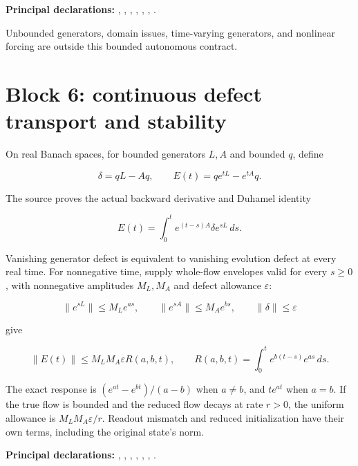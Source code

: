\documentclass[11pt]{article}
\begin{document}
\textbf{Principal declarations:}
\texttt{},
\texttt{},
\texttt{},
\texttt{},
\texttt{},
\texttt{},
\texttt{}.

Unbounded generators, domain issues, time-varying generators, and
nonlinear forcing are outside this bounded autonomous contract.

\hypertarget{block-6-continuous-defect-transport-and-stability}{%
\section{Block 6: continuous defect transport and
stability}\label{block-6-continuous-defect-transport-and-stability}}

On real Banach spaces, for bounded generators \(L,A\) and bounded \(q\),
define

\[
\delta=qL-Aq,\qquad E(t)=qe^{tL}-e^{tA}q.
\]

The source proves the actual backward derivative and Duhamel identity

\[
E(t)=\int_0^te^{(t-s)A}\delta e^{sL}\,ds.
\]

Vanishing generator defect is equivalent to vanishing evolution defect
at every real time. For nonnegative time, supply whole-flow envelopes
valid for every \(s\ge0\), with nonnegative amplitudes \(M_L,M_A\) and
defect allowance \(\varepsilon\):

\[
\|e^{sL}\|\le M_Le^{as},\qquad
\|e^{sA}\|\le M_Ae^{bs},\qquad \|\delta\|\le\varepsilon
\]

give

\[
\|E(t)\|\le M_LM_A\varepsilon R(a,b,t),\qquad
R(a,b,t)=\int_0^te^{b(t-s)}e^{as}\,ds.
\]

The exact response is \((e^{at}-e^{bt})/(a-b)\) when \(a\ne b\), and
\(te^{at}\) when \(a=b\). If the true flow is bounded and the reduced
flow decays at rate \(r>0\), the uniform allowance is
\(M_LM_A\varepsilon/r\). Readout mismatch and reduced initialization
have their own terms, including the original state's norm.

\textbf{Principal declarations:}
\texttt{},
\texttt{},
\texttt{},
\texttt{},
\texttt{},
\texttt{},
\texttt{}.
\end{document}
